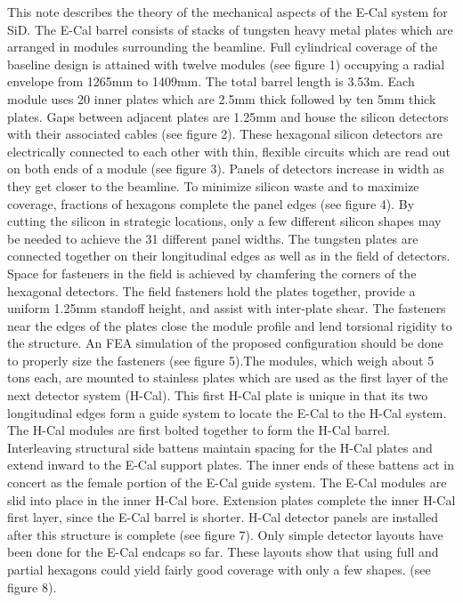 This note describes the theory of the mechanical aspects of the E-Cal system for SiD.
The E-Cal barrel consists of stacks of tungsten heavy metal plates which are arranged in modules surrounding the beamline. Full cylindrical coverage of the baseline design is attained with twelve modules (see figure 1) occupying a radial envelope from 1265mm to 1409mm. The total barrel length is 3.53m.
Each module uses 20 inner plates which are 2.5mm thick followed by ten 5mm thick plates. Gaps between adjacent plates are 1.25mm and house the silicon detectors with their associated cables (see figure 2). These hexagonal silicon detectors are electrically connected to each other with thin, flexible circuits which are read out on both ends of a module (see figure 3).  Panels of detectors increase in width as they get closer to the beamline. To minimize silicon waste and to maximize coverage, fractions of hexagons complete the panel edges (see figure 4). By cutting the silicon in strategic locations, only a few different silicon shapes may be needed to achieve the 31 different panel widths.
The tungsten plates are connected together on their longitudinal edges as well as in the field of detectors. Space for fasteners in the field is achieved by chamfering the corners of the hexagonal detectors. The field fasteners hold the plates together, provide a uniform 1.25mm standoff height, and assist with inter-plate shear. The fasteners near the edges of the plates close the module profile and lend torsional rigidity to the structure. An FEA simulation of the proposed configuration should be done to properly size the fasteners (see figure 5).The modules, which weigh about 5 tons each, are mounted to stainless plates which are used as the first layer of the next detector system (H-Cal). This first H-Cal plate is unique in that its two longitudinal edges form a guide system to locate the E-Cal to the H-Cal system.  The H-Cal modules are first bolted together to form the H-Cal barrel. Interleaving structural side battens maintain spacing for the H-Cal plates and extend inward to the E-Cal support plates. The inner ends of these battens act in concert as the female portion of the E-Cal guide system. The E-Cal modules are slid into place in the inner H-Cal bore. Extension plates complete the inner H-Cal first layer, since the E-Cal barrel is shorter. H-Cal detector panels are installed after this structure is complete (see figure 7).
Only simple detector layouts have been done for the E-Cal endcaps so far. These layouts show that using full and partial hexagons could yield fairly good coverage with only a few shapes. (see figure 8).

